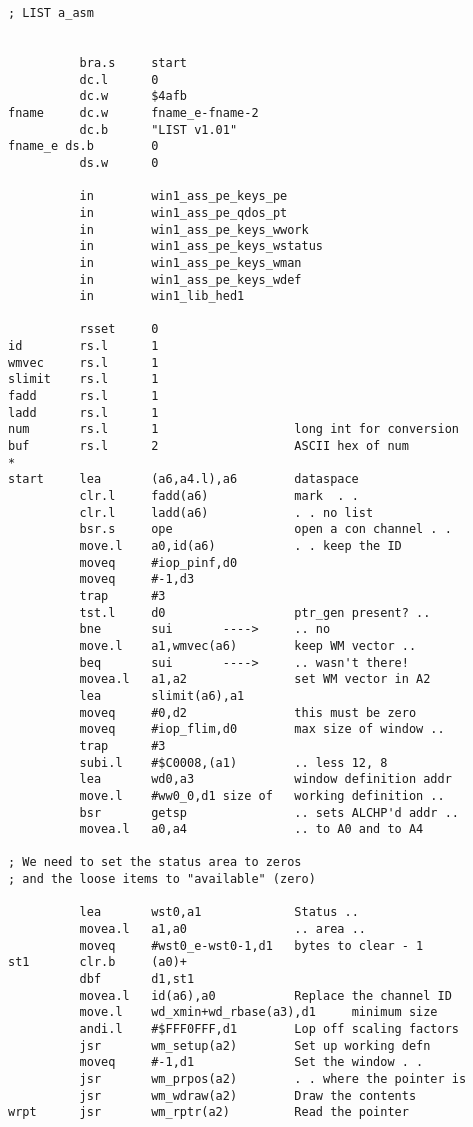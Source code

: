 \begin{lstlisting}[firstnumber=1,caption={George's Linked List Example Program}]
; LIST a_asm


          bra.s     start
          dc.l      0
          dc.w      $4afb
fname     dc.w      fname_e-fname-2
          dc.b      "LIST v1.01"
fname_e ds.b        0
          ds.w      0

          in        win1_ass_pe_keys_pe
          in        win1_ass_pe_qdos_pt
          in        win1_ass_pe_keys_wwork
          in        win1_ass_pe_keys_wstatus
          in        win1_ass_pe_keys_wman
          in        win1_ass_pe_keys_wdef
          in        win1_lib_hed1

          rsset     0
id        rs.l      1
wmvec     rs.l      1
slimit    rs.l      1
fadd      rs.l      1
ladd      rs.l      1
num       rs.l      1                   long int for conversion
buf       rs.l      2                   ASCII hex of num
*
start     lea       (a6,a4.l),a6        dataspace
          clr.l     fadd(a6)            mark  . .
          clr.l     ladd(a6)            . . no list
          bsr.s     ope                 open a con channel . .
          move.l    a0,id(a6)           . . keep the ID
          moveq     #iop_pinf,d0
          moveq     #-1,d3
          trap      #3
          tst.l     d0                  ptr_gen present? ..
          bne       sui       ---->     .. no
          move.l    a1,wmvec(a6)        keep WM vector ..
          beq       sui       ---->     .. wasn't there!
          movea.l   a1,a2               set WM vector in A2
          lea       slimit(a6),a1
          moveq     #0,d2               this must be zero
          moveq     #iop_flim,d0        max size of window ..
          trap      #3
          subi.l    #$C0008,(a1)        .. less 12, 8
          lea       wd0,a3              window definition addr
          move.l    #ww0_0,d1 size of   working definition ..
          bsr       getsp               .. sets ALCHP'd addr ..
          movea.l   a0,a4               .. to A0 and to A4

; We need to set the status area to zeros
; and the loose items to "available" (zero)

          lea       wst0,a1             Status ..
          movea.l   a1,a0               .. area ..
          moveq     #wst0_e-wst0-1,d1   bytes to clear - 1
st1       clr.b     (a0)+
          dbf       d1,st1
          movea.l   id(a6),a0           Replace the channel ID
          move.l    wd_xmin+wd_rbase(a3),d1     minimum size
          andi.l    #$FFF0FFF,d1        Lop off scaling factors
          jsr       wm_setup(a2)        Set up working defn
          moveq     #-1,d1              Set the window . .
          jsr       wm_prpos(a2)        . . where the pointer is
          jsr       wm_wdraw(a2)        Draw the contents
wrpt      jsr       wm_rptr(a2)         Read the pointer


\end{lstlisting}
